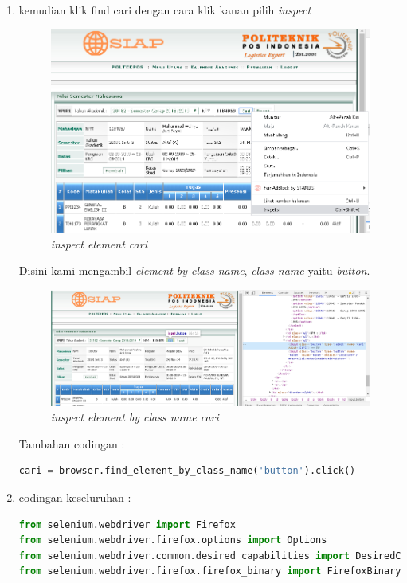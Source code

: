 \begin{enumerate}
\item kemudian klik find cari dengan cara klik kanan pilih \textit{inspect}
\begin{figure}[H]
    	\centering
    	\includegraphics[scale=0.3]{figures/cari1.png}
    	\caption{\textit{inspect element cari}}
    	\label{CLI}
	\end{figure}
	
Disini kami mengambil \textit{element by class name}, \textit{class name} yaitu \textit{button}.
\begin{figure}[H]
    	\centering
    	\includegraphics[scale=0.3]{figures/button1.png}
    	\caption{\textit{inspect element by class name cari}}
    	\label{CLI}
	\end{figure}

Tambahan codingan :
\begin{lstlisting}[language=Python]
cari = browser.find_element_by_class_name('button').click()
\end{lstlisting}


\item codingan keseluruhan :
\begin{lstlisting}[language=Python]
from selenium.webdriver import Firefox
from selenium.webdriver.firefox.options import Options
from selenium.webdriver.common.desired_capabilities import DesiredCapabilities
from selenium.webdriver.firefox.firefox_binary import FirefoxBinary


\end{lstlisting}
\end{enumerate}
